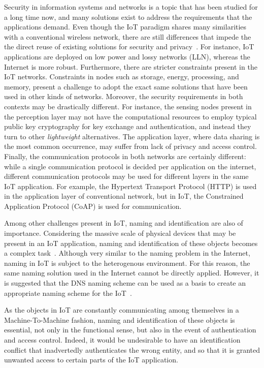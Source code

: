 \documentclass[12pt]{article}
\begin{document}
Security in information systems and networks is a topic that has been studied for a long time now, and many solutions exist to address the requirements that the applications demand. Even though the IoT paradigm shares many similarities with a conventional wireless network, there are still differences that impede the the direct reuse of existing solutions for security and privacy~\cite{ALABA201710}. For instance, IoT applications are deployed on low power and lossy networks (LLN), whereas the Internet is more robust. Furthermore, there are stricter constraints present in the IoT networks. Constraints in nodes such as storage, energy, processing, and memory, present a challenge to adopt the exact same solutions that have been used in other kinds of networks. Moreover, the security requirements in both contexts may be drastically different. For instance, the sensing nodes present in the perception layer may not have the computational resources to employ typical public key cryptography for key exchange and authentication, and instead they turn to other \emph{lightweight} alternatives. The application layer, where data sharing is the most common occurrence, may suffer from lack of privacy and access control. Finally, the communication protocols in both networks are certainly different: while a single communication protocol is decided per application on the internet, different communication protocols may be used for different layers in the same IoT application. For example, the Hypertext Transport Protocol (HTTP) is used in the application layer of conventional network, but in IoT, the Constrained Application Protocol (CoAP) is used for communication.

Among other challenges present in IoT, naming and identification are also of importance. Considering the massive scale of physical devices that may be present in an IoT application, naming and identification of these objects becomes a complex task~\cite{Zhang:2015}. Although very similar to the naming problem in the Internet, naming in IoT is subject to the heterogenous environment. For this reason, the same naming solution used in the Internet cannot be directly applied. However, it is suggested that the DNS naming scheme can be used as a basis to create an appropriate naming scheme for the IoT~\cite{Zhang:2015}. 

As the objects in IoT are constantly communicating among themselves in a Machine-To-Machine fashion, naming and identification of these objects is essential, not only in the functional sense, but also in the event of authentication and access control. Indeed, it would be undesirable to have an identification conflict that inadvertedly authenticates the wrong entity, and so that it is granted unwanted access to certain parts of the IoT application.
\end{document}
